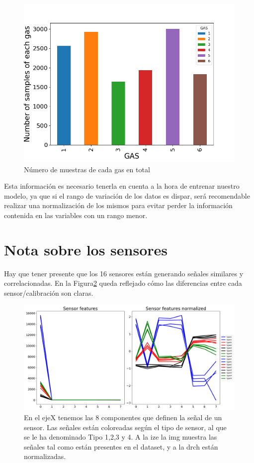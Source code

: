 \begin{figure}[ht!]
	\centering
	\includegraphics[width=\columnwidth]{../py_imgs/Step0_Count_Gas.png}
	\caption[Número de muestras por gas]{Número de muestras de cada gas en total}
	\label{fig: gasCount}
\end{figure}


Esta información es necesario tenerla en cuenta a la hora de entrenar nuestro modelo, ya que
si el rango de variación de los datos es dispar, será recomendable realizar una normalización de los mismos para evitar perder la información contenida en las variables con un rango menor.


\section{Nota sobre los sensores}

Hay que tener presente que los 16 sensores están generando señales similares y correlacionadas. En la Figura\ref{fig:step01sensorfeaturescolor} queda reflejado cómo las diferencias entre cada sensor/calibración son claras. 

\begin{figure}
	\centering
	\includegraphics[width=1\linewidth]{../py_imgs/Step0_1_SensorFeaturesColor}
	\caption[Señales de los sensores coloreadas por tipo.]{En el ejeX tenemos las 8 componentes que definen la señal de un sensor. Las señales están coloreadas según el tipo de sensor, al que se le ha denominado Tipo 1,2,3 y 4. A la ize la img muestra las señales tal como están presentes en el dataset, y a la drch están normalizadas. }
	\label{fig:step01sensorfeaturescolor}
\end{figure}

